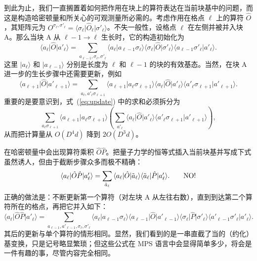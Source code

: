 \documentclass[a4paper,10pt,oneside,onecolumn,1p,times]{elsarticle}
\newcommand{\bra}[1]{\mbox{$\langle #1  |$}}
\newcommand{\ket}[1]{\mbox{$| #1  \rangle$}}
\newcommand{\braket}[2]{\mbox{$\langle #1  | #2 \rangle$}} 	%
\begin{document}
到此为止，我们一直搁置着如何把作用在块上的算符表达在当前块基中的问题，而这是构造哈密顿量和所关心的可观测量所必需的。考虑作用在格点 $\ell$ 上的算符 $\hat{O}$，其矩阵元为 $O^{\sigma_\ell,\sigma'_\ell}=\bra{\sigma_\ell} \hat{O}_{\ell} \ket{\sigma'_\ell}$。不失一般性，设格点 $\ell$ 在左侧并被并入块 A。那么当块 A 从 $\ell-1 \rightarrow \ell$ 生长时，它的构造初始化为
\begin{equation}
\bra{a_\ell} \hat{O} \ket{a'_\ell} = \sum_{a_{\ell-1},\sigma_\ell,\sigma'_\ell}
\braket{a_\ell}{a_{\ell-1}\sigma_\ell} \bra{\sigma_\ell} \hat{O} \ket{\sigma'_\ell} \braket{a_{\ell-1}\sigma'_\ell}{a'_\ell} .
\end{equation}
这里 $\ket{a_\ell}$ 和 $\ket{a_{\ell-1}}$ 分别是长度为 $\ell$ 和 $\ell-1$ 的块的有效基态。当然，在块 A 进一步的生长步骤中还需要更新，例如
\begin{equation}
\bra{a_{\ell+1}} \hat{O} \ket{a'_{\ell+1}} = \sum_{a_{\ell},a'_{\ell}\sigma_{\ell+1}}
\braket{a_{\ell+1}}{a_{\ell}\sigma_{\ell+1}} \bra{a_\ell} \hat{O} \ket{a'_\ell} \braket{a'_{\ell}\sigma_{\ell+1}}{a'_{\ell+1}} .
\label{eq:update}
\end{equation}
重要的是要意识到，式~(\ref{eq:update}) 中的求和必须拆分为
\begin{equation}
\sum_{a_{\ell}\sigma_{\ell+1}} \braket{a_{\ell+1}}{a_{\ell}\sigma_{\ell+1}} \left( \sum_{a'_{\ell}}
 \bra{a_\ell} \hat{O} \ket{a'_\ell} \braket{a'_{\ell}\sigma_{\ell+1}}{a'_{\ell+1}} \right),
\end{equation}
从而把计算量从 $O(D^4 d)$ 降到 $2O(D^3 d)$。

在哈密顿量中会出现算符乘积 $\hat{O}\hat{P}$。把量子力学的恒等式插入当前块基并写成下式虽然诱人，但由于截断步骤众多而极不精确：
\begin{equation}
\bra{a_\ell} \hat{O}\hat{P} \ket{a'_\ell} = \sum_{\tilde{a}_\ell} \bra{a_\ell} \hat{O} \ket{\tilde{a}_\ell} \bra{\tilde{a}_\ell} \hat{P} \ket{a'_\ell} . \quad\quad {\rm NO!}
\end{equation}
正确的做法是：不断更新第一个算符（对左块 A 从左往右数），直到到达第二个算符所在的格点，再把它并入如下：
\begin{equation}
\bra{a_\ell} \hat{O} \hat{P} \ket{a'_\ell} = \sum_{a_{\ell-1},a'_{\ell-1},\sigma_\ell,\sigma'_\ell}
\braket{a_\ell}{a_{\ell-1}\sigma_\ell}  \bra{a_{\ell-1}} \hat{O} \ket{a'_{\ell-1}} \bra{\sigma_\ell} \hat{P} \ket{\sigma'_\ell} \braket{a'_{\ell-1}\sigma'_\ell}{a'_\ell} .
\label{eq:incorporate}
\end{equation}
其后的更新与单个算符的情形相同。显然，我们看到的是一串直截了当的（约化）基变换，只是记号略显繁琐；但这些公式在 MPS 语言中会显得简单多少，将会是一件有趣的事，尽管内容完全相同。
\end{document}
